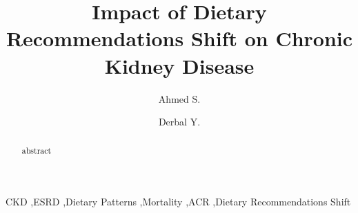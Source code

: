 \documentclass[5p,times,authoryear]{elsarticle}
\begin{document}
\begin{frontmatter}






\title{Impact of Dietary Recommendations Shift on  Chronic Kidney Disease}



\author[First]{Ahmed S. }

\author[Second]{Derbal Y. }




\address[First]{Data Science and Analytics Department, Ryerson University, Toronto, Canada}
\address[Second]{Department of Information Technolofy Management, Ryerson University, Toronto, Canada}

\begin{abstract}
 {abstract}
\end{abstract}

\begin{keyword}
CKD \sep ESRD \sep  Dietary Patterns \sep  Mortality \sep  ACR \sep  Dietary Recommendations Shift
\end{keyword}

\end{frontmatter}
\end{document}
